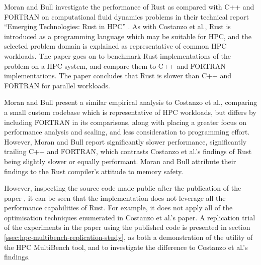 Moran and Bull \cite{moranEmergingTechnologiesRust2023} investigate the performance of Rust as compared with C++ and FORTRAN on computational fluid dynamics problems in their technical report ``Emerging Technologies: Rust in HPC'' \cite{moranEmergingTechnologiesRust2023}. As with Costanzo et al., Rust is introduced as a programming language which may be suitable for HPC, and the selected problem domain is explained as representative of common \acrshort{HPC} workloads. The paper goes on to benchmark Rust implementations of the problem on a HPC system, and compare them to C++ and FORTRAN implementations. The paper concludes that Rust is slower than C++ and FORTRAN for parallel workloads.

Moran and Bull present a similar empirical analysis to Costanzo et al., comparing a small custom codebase which is representative of \acrshort{HPC} workloads, but differs by including FORTRAN in its comparisons, along with placing a greater focus on performance analysis and scaling, and less consideration to programming effort. However, Moran and Bull report significantly slower performance, significantly trailing C++ and FORTRAN, which contrasts Costanzo et al.'s findings of Rust being slightly slower or equally performant. Moran and Bull attribute their findings to the Rust compiler's attitude to memory safety.

However, inspecting the source code made public after the publication of the paper \cite{Lmoran94Eurocc_cfdCFD}, it can be seen that the implementation does not leverage all the performance capabilities of Rust. For example, it does not apply all of the optimisation techniques enumerated in Costanzo et al.'s paper.
A replication trial of the experiments in the paper using the published code is presented in section \ref{ssec:hpc-multibench-replication-study}, as both a demonstration of the utility of the HPC MultiBench tool, and to investigate the difference to Costanzo et al.'s findings.


